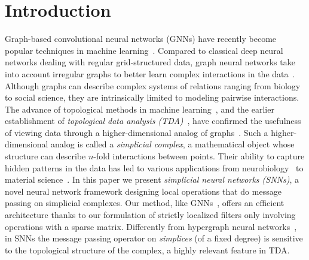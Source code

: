 \section{Introduction}



Graph-based convolutional neural networks (GNNs) have recently become popular techniques in machine learning~\cite{defferrard2016convolutional, bronstein2017geometric, wu2020survey}. Compared to classical deep neural networks dealing with regular grid-structured data, graph neural networks take into account irregular graphs to better learn complex interactions in the data~\cite{battaglia2018relational}. Although graphs can describe complex systems of relations ranging from biology to social science, they are intrinsically limited to modeling pairwise interactions. The advance of topological methods in machine learning~\cite{Gabrielsson2020topological, Hofer2019LearningRO, rieck2018neural}, and the earlier establishment of \emph{topological data analysis (TDA)}~\cite{carlsson2008,chazal2017,edelsbrunner2010computational,ghrist2008barcodes}, have confirmed the usefulness of viewing data through a higher-dimensional analog of graphs~\cite{moore2012,patania2017}. Such a higher-dimensional analog is called a \emph{simplicial complex}, a mathematical object whose structure can  describe $n$-fold interactions between points. Their ability to capture hidden patterns in the data has led to various applications from neurobiology~\cite{giusti2015,reimann2017} to material science~\cite{hiraoka2016}. In this paper we present \textit{simplicial neural networks (SNNs)}, a novel neural network framework designing local operations that do message passing on simplicial complexes.
Our method, like GNNs~\cite{defferrard2016convolutional}, offers an efficient architecture thanks to our formulation of strictly localized filters only involving operations with a sparse matrix. 
Differently from hypergraph neural networks~\cite{feng2018hypergraphs}, in SNNs the message passing operator on \emph{simplices} (of a fixed degree) is sensitive to the topological structure of the complex, a highly relevant feature in TDA.







 













